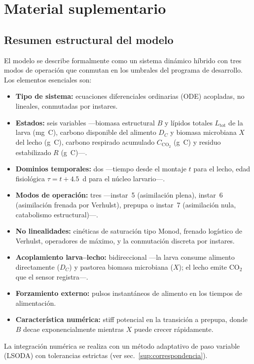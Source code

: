 \section*{Material suplementario}

\subsection{Resumen estructural del modelo}
\label{sup:resumen}

El modelo se describe formalmente como un sistema dinámico híbrido con tres modos de operación que conmutan en los umbrales del programa de desarrollo. Los elementos esenciales son:

\begin{itemize}
  \item \textbf{Tipo de sistema:} ecuaciones diferenciales ordinarias (ODE) acopladas, no lineales, conmutadas por instares.
  \item \textbf{Estados:} seis variables ---biomasa estructural $B$ y lípidos totales $L_{\mathrm{tot}}$ de la larva (mg~C), carbono disponible del alimento $D_C$ y biomasa microbiana $X$ del lecho (g~C), carbono respirado acumulado $C_{\mathrm{CO_2}}$ (g~C) y residuo estabilizado $R$ (g~C)---.
  \item \textbf{Dominios temporales:} dos ---tiempo desde el montaje $t$ para el lecho, edad fisiológica $\tau=t+4.5$~d para el núcleo larvario---.
  \item \textbf{Modos de operación:} tres ---instar~5 (asimilación plena), instar~6 (asimilación frenada por Verhulst), prepupa o instar~7 (asimilación nula, catabolismo estructural)---.
  \item \textbf{No linealidades:} cinéticas de saturación tipo Monod, frenado logístico de Verhulst, operadores de máximo, y la conmutación discreta por instares.
  \item \textbf{Acoplamiento larva--lecho:} bidireccional ---la larva consume alimento directamente ($D_C$) y pastorea biomasa microbiana ($X$); el lecho emite CO$_2$ que el sensor registra---.
  \item \textbf{Forzamiento externo:} pulsos instantáneos de alimento en los tiempos de alimentación.
  \item \textbf{Característica numérica:} stiff potencial en la transición a prepupa, donde $B$ decae exponencialmente mientras $X$ puede crecer rápidamente.
\end{itemize}

La integración numérica se realiza con un método adaptativo de paso variable (LSODA) con tolerancias estrictas (ver sec.~\ref{sup:correspondencia}).

